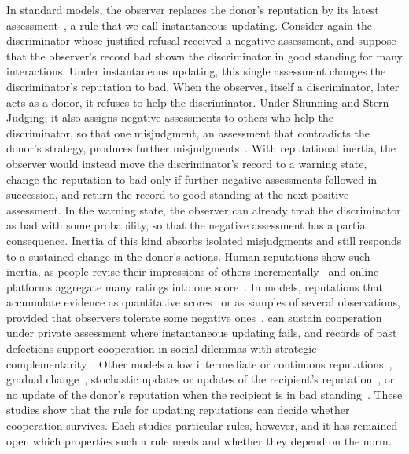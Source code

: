 \documentclass[10pt]{wlscirep}
\theoremstyle{plain}
\theoremstyle{remark}
\begin{document}
In standard models, the observer replaces the donor's reputation by its latest assessment~\cite{ohtsuki2004,hilbe2018}, a rule that we call instantaneous updating. Consider again the discriminator whose justified refusal received a negative assessment, and suppose that the observer's record had shown the discriminator in good standing for many interactions. Under instantaneous updating, this single assessment changes the discriminator's reputation to bad. When the observer, itself a discriminator, later acts as a donor, it refuses to help the discriminator. Under Shunning and Stern Judging, it also assigns negative assessments to others who help the discriminator, so that one misjudgment, an assessment that contradicts the donor's strategy, produces further misjudgments~\cite{hilbe2018,radzvilavicius2019,fujimoto2022}. With reputational inertia, the observer would instead move the discriminator's record to a warning state, change the reputation to bad only if further negative assessments followed in succession, and return the record to good standing at the next positive assessment. In the warning state, the observer can already treat the discriminator as bad with some probability, so that the negative assessment has a partial consequence. Inertia of this kind absorbs isolated misjudgments and still responds to a sustained change in the donor's actions. Human reputations show such inertia, as people revise their impressions of others incrementally~\cite{mendesiedlecki2013neural,siegel2018,yamamoto2025} and online platforms aggregate many ratings into one score~\cite{tadelis2016}. In models, reputations that accumulate evidence as quantitative scores~\cite{schmid2023} or as samples of several observations, provided that observers tolerate some negative ones~\cite{michelmata2024}, can sustain cooperation under private assessment where instantaneous updating fails, and records of past defections support cooperation in social dilemmas with strategic complementarity~\cite{clark2020}. Other models allow intermediate or continuous reputations~\cite{tanabe2013,murase2022,lee2021}, gradual change~\cite{yamamoto2025}, stochastic updates or updates of the recipient's reputation~\cite{murase2023,okada2024,tham2026}, or no update of the donor's reputation when the recipient is in bad standing~\cite{sasaki2017,okada2017,okada2018}. These studies show that the rule for updating reputations can decide whether cooperation survives. Each studies particular rules, however, and it has remained open which properties such a rule needs and whether they depend on the norm.
\end{document}
